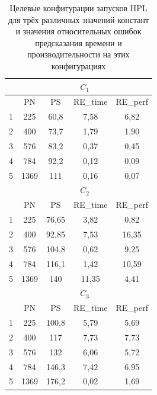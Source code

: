 		\begin{table}[t]
			\centering
			\begin{tabular}{|r||c|c|c|c|}
				\hline
				            & \multicolumn{4}{|c|}{\(C_1\)}     \\ \hline
				\textnumero &   PN &   PS & RE\_time & RE\_perf \\ \hline
				          1 &  225 & 60,8 &     7,58 & 6,82     \\ \hline
				          2 &  400 & 73,7 &     1,79 & 1,90     \\ \hline
				          3 &  576 & 83,2 &     0,37 & 0,45     \\ \hline
				          4 &  784 & 92,2 &     0,12 & 0,09     \\ \hline
				          5 & 1369 &  111 &     0,16 & 0,07     \\ \hline
				\hline
				            & \multicolumn{4}{|c|}{\(C_2\)}      \\ \hline
				\textnumero &   PN &    PS & RE\_time & RE\_perf \\ \hline
				          1 &  225 & 76,65 &     3,82 & 0,82     \\ \hline
				          2 &  400 & 92,85 &     7,53 & 16,35    \\ \hline
				          3 &  576 & 104,8 &     0,62 & 9,25     \\ \hline
				          4 &  784 & 116,1 &     1,42 & 10,59    \\ \hline
				          5 & 1369 &   140 &    11,35 & 4,41     \\ \hline
				\hline
				            & \multicolumn{4}{|c|}{\(C_3\)}      \\ \hline
				\textnumero &   PN &    PS & RE\_time & RE\_perf \\ \hline
				          1 &  225 & 100,8 &     5,79 & 5,69     \\ \hline
				          2 &  400 &   117 &     7,73 & 7,73     \\ \hline
				          3 &  576 &   132 &     6,06 & 5,72     \\ \hline
				          4 &  784 & 146,3 &     7,42 & 6,95     \\ \hline
				          5 & 1369 & 176,2 &     0,02 & 1,69     \\ \hline
			\end{tabular}
			\caption{Целевые конфигурации запусков HPL для трёх различных значений констант и значения относительных ошибок предсказания времени и производительности на этих конфигурациях}
			\label{target_HPL}
		\end{table}
